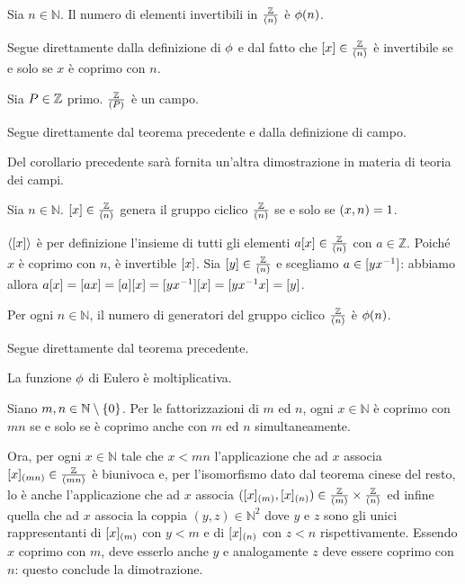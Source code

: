 \begin{Theorem}
	Sia $n \in \mathbb{N}$. Il numero di elementi invertibili in $\frac{\mathbb{Z}}{\left ( n \right )}$ \`e $\phi(n)$.
\end{Theorem}
\Proof Segue direttamente dalla definizione di $\phi$ e dal fatto che $\EquivalenceClass{x} \in \Quotient{\mathbb{Z}}{\SpanIdeal{n}}$ \`e invertibile se e solo se $x$ \`e coprimo con $n$. \EndProof
\begin{Corollary}
	Sia $P \in \mathbb{Z}$ primo. $\frac{\mathbb{Z}}{\left ( P \right )}$ \`e un campo.
\end{Corollary}
\Proof Segue direttamente dal teorema precedente e dalla definizione di campo. \EndProof
\par Del corollario precedente sar\`a fornita un'altra dimostrazione in materia di teoria dei campi.
\begin{Theorem}
	Sia $n \in \mathbb{N}$. $\EquivalenceClass{x} \in \Quotient{\mathbb{Z}}{\SpanIdeal{n}}$ genera il gruppo ciclico $\frac{\mathbb{Z}}{\left ( n \right )}$ se e solo se $\left ( x,n \right ) = 1$.
\end{Theorem}
\Proof $\SpanGroup{\EquivalenceClass{x}}$ \`e per definizione l'insieme di tutti gli elementi $a\EquivalenceClass{x} \in \Quotient{\mathbb{Z}}{\SpanIdeal{n}}$ con $a \in \mathbb{Z}$. Poich\'e $x$ \`e coprimo con $n$, \`e invertible $\EquivalenceClass{x}$. Sia $\EquivalenceClass{y} \in \Quotient{\mathbb{Z}}{\SpanIdeal{n}}$ e scegliamo $a \in \EquivalenceClass{yx^{-1}}$: abbiamo allora $a\EquivalenceClass{x} = \EquivalenceClass{ax} = \EquivalenceClass{a}\EquivalenceClass{x} = \EquivalenceClass{yx^{-1}}\EquivalenceClass{x} = \EquivalenceClass{yx^{-1}x} = \EquivalenceClass{y}$. \EndProof
\begin{Corollary}
	Per ogni $n \in \mathbb{N}$, il numero di generatori del gruppo ciclico $\frac{\mathbb{Z}}{\left ( n \right )}$ \`e $\phi(n)$.
\end{Corollary}
\Proof Segue direttamente dal teorema precedente. \EndProof
\begin{Theorem}
	La funzione $\phi$ di Eulero \`e moltiplicativa.
\end{Theorem}
\Proof Siano $m, n \in \mathbb{N} \setminus \lbrace 0 \rbrace$. Per le fattorizzazioni di $m$ ed $n$, ogni $x \in \mathbb{N}$ \`e coprimo con $mn$ se e solo se \`e coprimo anche con $m$ ed $n$ simultaneamente.
\par Ora, per ogni $x \in \mathbb{N}$ tale che $x < mn$ l'applicazione che ad $x$ associa $\EquivalenceClass{x}[\SpanIdeal{mn}] \in \Quotient{\mathbb{Z}}{\SpanIdeal{mn}}$ \`e biunivoca e, per l'isomorfismo dato dal teorema cinese del resto, lo \`e anche l'applicazione che ad $x$ associa $(\EquivalenceClass{x}[\SpanIdeal{m}],\EquivalenceClass{x}[\SpanIdeal{n}]) \in \Quotient{\mathbb{Z}}{\SpanIdeal{m}} \times \Quotient{\mathbb{Z}}{\SpanIdeal{n}}$ ed infine quella che ad $x$ associa la coppia $(y,z) \in \mathbb{N}^2$ dove $y$ e $z$ sono gli unici rappresentanti di $\EquivalenceClass{x}[\SpanIdeal{m}]$ con $y < m$ e di $\EquivalenceClass{x}[\SpanIdeal{n}]$ con $z < n$ rispettivamente. Essendo $x$ coprimo con $m$, deve esserlo anche $y$ e analogamente $z$ deve essere coprimo con $n$: questo conclude la dimotrazione. \EndProof
